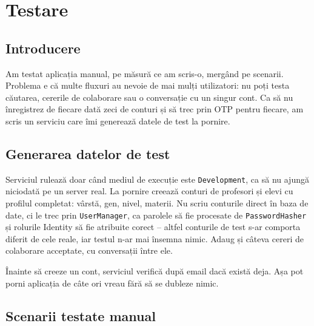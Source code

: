 \chapter{Testare}

\section{Introducere}

Am testat aplicația manual, pe măsură ce am scris-o, mergând pe scenarii.
Problema e că multe fluxuri au nevoie de mai mulți utilizatori: nu poți testa
căutarea, cererile de colaborare sau o conversație cu un singur cont. Ca să nu
înregistrez de fiecare dată zeci de conturi și să trec prin OTP pentru fiecare,
am scris un serviciu care îmi generează datele de test la pornire.

\section{Generarea datelor de test}

Serviciul rulează doar când mediul de execuție este \texttt{Development}, ca să
nu ajungă niciodată pe un server real. La pornire creează conturi de profesori și
elevi cu profilul completat: vârstă, gen, nivel, materii. Nu scriu conturile
direct în baza de date, ci le trec prin \texttt{UserManager}, ca parolele să fie
procesate de \texttt{PasswordHasher} și rolurile Identity să fie atribuite corect
-- altfel conturile de test s-ar comporta diferit de cele reale, iar testul n-ar
mai însemna nimic. Adaug și câteva cereri de colaborare acceptate, cu conversații
între ele.

Înainte să creeze un cont, serviciul verifică după email dacă există deja. Așa pot
porni aplicația de câte ori vreau fără să se dubleze nimic.

\section{Scenarii testate manual}


